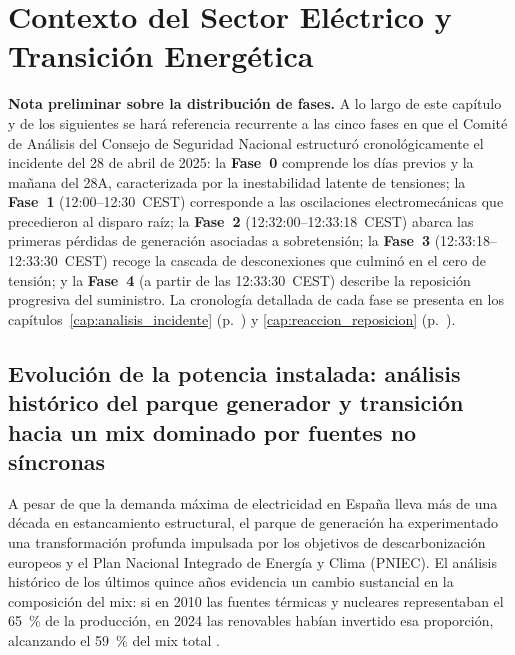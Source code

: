 
\chapter{Contexto del Sector Eléctrico y Transición Energética}
\label{cap:contexto_sector}

\bigskip

\noindent\textbf{Nota preliminar sobre la distribución de fases.}\quad
A lo largo de este capítulo y de los siguientes se hará referencia
recurrente a las cinco fases en que el Comité de Análisis del Consejo
de Seguridad Nacional estructuró cronológicamente el incidente del
28 de abril de 2025: la \textbf{Fase~0} comprende los días previos y la
mañana del 28A, caracterizada por la inestabilidad latente de tensiones;
la \textbf{Fase~1} (12:00--12:30~CEST) corresponde a las oscilaciones
electromecánicas que precedieron al disparo raíz; la \textbf{Fase~2}
(12:32:00--12:33:18~CEST) abarca las primeras pérdidas de generación
asociadas a sobretensión; la \textbf{Fase~3} (12:33:18--12:33:30~CEST)
recoge la cascada de desconexiones que culminó en el cero de tensión;
y la \textbf{Fase~4} (a partir de las 12:33:30~CEST) describe la
reposición progresiva del suministro. La cronología detallada de cada
fase se presenta en los capítulos~\ref{cap:analisis_incidente}
(p.~\pageref{cap:analisis_incidente}) y \ref{cap:reaccion_reposicion}
(p.~\pageref{cap:reaccion_reposicion}).

\bigskip

\section{Evolución de la potencia instalada: análisis histórico del parque generador
y transición hacia un mix dominado por fuentes no síncronas}
\label{sec:evolucion_potencia}

\lettrine[lines=3, lhang=0.1]{A}{} pesar de que la demanda máxima de electricidad en España lleva más de una
década en estancamiento estructural, el parque de generación ha experimentado
una transformación profunda impulsada por los objetivos de descarbonización europeos y el
Plan Nacional Integrado de Energía y Clima (PNIEC). El análisis histórico de los
últimos quince años evidencia un cambio sustancial en la composición del mix:
si en 2010 las fuentes térmicas y nucleares representaban el 65~\% de la
producción, en 2024 las renovables habían invertido esa proporción, alcanzando
el 59~\% del mix total \cite{mitceepr2025}.

